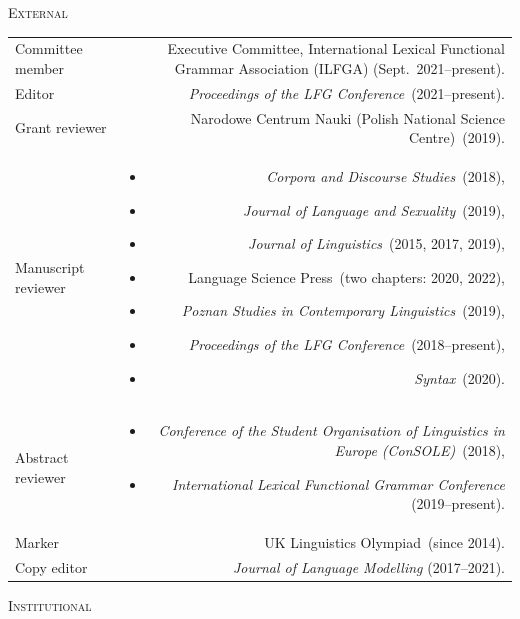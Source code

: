 \documentclass[11pt,a4paper]{article}
\makeatletter
\newlength{\rulelength}%
\newenvironment{cvsection}{%
  \setlength{\extrarowheight}{0.70ex}
  \begin{longtable}[l]{@{} L R @{}}
}{%
  \end{longtable}
}
\newlength{\squish}
\newenvironment{reviewlist}
{%
\vspace*{\squish}%
\begin{itemize}[noitemsep,label={},nosep,left=0pt .. \parindent]%
}
{%
\end{itemize}
}
\newcommand{\Label}[1]{%
\textnormal{#1}%
}
\newcommand{\cvheading}[1]{\noindent{{\color{headercolor}\rule[0.4ex]{\rulelength}{2pt}\hspace*{9pt} \Large #1}}\vspace*{0.5\baselineskip}}
\newcommand{\cvsubhead}[1]{\noindent\hspace*{\rulelength}\hspace*{9pt} \textsc{#1}\vspace*{0.25\baselineskip}}
\makeatother
\begin{document}

\cvheading{Commissions of trust}

\cvsubhead{External}
\begin{cvsection}
  \Label{Committee member} & Executive Committee, International Lexical Functional Grammar Association (ILFGA) (Sept.~2021--present).\\
  \Label{Editor} & \textit{Proceedings of the LFG Conference}~(2021--present).\\
\Label{Grant reviewer} &
                    Narodowe Centrum Nauki (Polish National Science Centre)~(2019).\\
\Label{Manuscript reviewer} &
                \begin{reviewlist}
                \item \textit{Corpora and Discourse Studies}~(2018),
                \item \textit{Journal of Language and Sexuality}~(2019),
                \item \textit{Journal of Linguistics}~(2015, 2017, 2019),
                \item Language Science Press~(two chapters: 2020, 2022),
                \item \textit{Poznan Studies in Contemporary Linguistics}~(2019),
                \item \textit{Proceedings of the LFG Conference}~(2018--present),
                \item  \textit{Syntax}~(2020).
                \end{reviewlist}
                 \\[\squish]
\Label{Abstract reviewer}   &
                \begin{reviewlist}
                \item \textit{Conference of the Student Organisation of Linguistics in Europe (ConSOLE)}~(2018),
                \item \textit{International Lexical Functional Grammar Conference} (2019--present).
                \end{reviewlist}
                \\[\squish]
\Label{Marker}      & UK Linguistics Olympiad~(since 2014).\\
\Label{Copy editor} & \textit{Journal of Language Modelling} (2017--2021).
\end{cvsection}
%
\vspace{0.2\squish}
%
\cvsubhead{Institutional}
\end{document}
